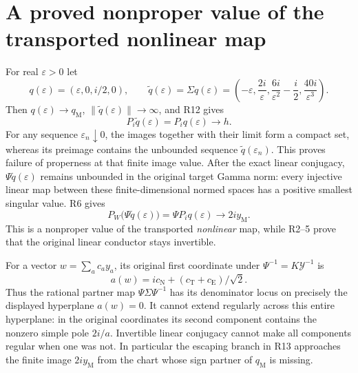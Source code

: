 \documentclass[11pt]{article}
\begin{document}
\section{A proved nonproper value of the transported nonlinear map}
For real $\varepsilon>0$ let
\[
 q(\varepsilon)=(\varepsilon,0,i/2,0),\qquad
 \widetilde q(\varepsilon)=\Sigma q(\varepsilon)
 =\left(-\varepsilon,\frac{2i}{\varepsilon},
 \frac{6i}{\varepsilon^2}-\frac i2,
 \frac{40i}{\varepsilon^3}\right).
\]
Then $q(\varepsilon)\to q_{\mathrm M}$,
$\|\widetilde q(\varepsilon)\|\to\infty$, and R12 gives
\[
 P_i\widetilde q(\varepsilon)=P_iq(\varepsilon)\longrightarrow h.
\]
For any sequence $\varepsilon_n\downarrow0$, the images together
with their limit form a compact set, whereas its preimage contains
the unbounded sequence $\widetilde q(\varepsilon_n)$. This proves
failure of properness at that finite image value. After the exact
linear conjugacy, $\Psi\widetilde q(\varepsilon)$ remains unbounded
in the original target Gamma norm: every injective linear map between
these finite-dimensional normed spaces has a positive smallest
singular value. R6 gives
\begin{equation}
 P_W\bigl(\Psi\widetilde q(\varepsilon)\bigr)
 =\Psi P_iq(\varepsilon)\longrightarrow 2i y_{\mathrm M}.\tag{R13}
\end{equation}
This is a nonproper value of the transported \emph{nonlinear} map,
while R2--5 prove that the original linear conductor stays invertible.

For a vector $w=\sum_ac_a y_a$, its original first coordinate under
$\Psi^{-1}=K\mathcal Y^{-1}$ is
\[
 a(w)=i c_{\mathrm N}+(c_{\mathrm T}+c_{\mathrm E})/\sqrt2.
\]
Thus the rational partner map $\Psi\Sigma\Psi^{-1}$ has its
denominator locus on precisely the displayed hyperplane $a(w)=0$.
It cannot extend regularly across this entire hyperplane: in the
original coordinates its second component contains the nonzero
simple pole $2i/a$. Invertible linear conjugacy cannot make all
components regular when one was not. In particular the escaping
branch in R13 approaches the finite image $2i y_{\mathrm M}$ from
the chart whose sign partner of $q_{\mathrm M}$ is missing.
\end{document}
